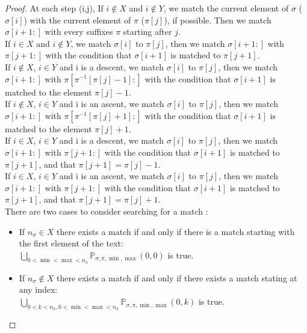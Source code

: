 \documentclass[a4paper]{llncs}
\newcommand{\ptext}{\pi}
\newcommand{\pmotif}{\sigma}
\newcommand{\x}{X}
\newcommand{\y}{Y}
\begin{document}
\begin{proof}
			At each step (i,j),
			If $i \notin \x$ and $i \notin \y$,
			we match the current element of $\pmotif$ ($\pmotif[i]$)
			with the current element of $\ptext$ ($\ptext[j]$), if possible.
			Then we match $\pmotif[i+1:]$ with 
			every suffixes $\ptext$ starting after $j$.\\
			
			If $i \in \x$ and $i \notin \y$,
			we match $\pmotif[i]$ to $\ptext[j]$, 
			then we match $\pmotif[i+1:]$ with $\ptext[j+1:]$
			with the condition that
			$\pmotif[i+1]$ is matched to $\ptext[j+1]$.\\
			
			If $i \notin \x$, $i \in \y$ and i is a descent,
			we match $\pmotif[i]$ to $\ptext[j]$, 
			then we match $\pmotif[i+1:]$ 
			with $\ptext[\ptext^{-1}[\ptext[j]-1]:]$
			with the condition that
			$\pmotif[i+1]$ is matched to the element $\ptext[j]-1$.\\						
			
			If $i \notin \x$, $i \in \y$ and i is an ascent,
			we match $\pmotif[i]$ to $\ptext[j]$, 
			then we match $\pmotif[i+1:]$ 
			with $\ptext[\ptext^{-1}[\ptext[j]+1]:]$
			with the condition that
			$\pmotif[i+1]$ is matched to the element $\ptext[j]+1$.\\	

			If $i \in \x$, $i \in \y$ and i is a descent,
			we match $\pmotif[i]$ to $\ptext[j]$, 
			then we match $\pmotif[i+1:]$ with $\ptext[j+1:]$
			with the condition that
			$\pmotif[i+1]$ is matched to $\ptext[j+1]$,
			and that $\ptext[j+1]=\ptext[j]-1$.\\			

			If $i \in \x$, $i \in \y$ and i is an ascent,
			we match $\pmotif[i]$ to $\ptext[j]$, 
			then we match $\pmotif[i+1:]$ with $\ptext[j+1:]$
			with the condition that
			$\pmotif[i+1]$ is matched to $\ptext[j+1]$,
			and that $\ptext[j+1]=\ptext[j]+1$.\\		
					
			There are two cases to consider searching for a match :
			\begin{itemize}
				\item If $n_\pmotif \in \x$ there exists a match if and only if there is a match starting with the first element of the text:\\ $\bigcup_{0<\min<\max<n_\ptext}\mathbb{P}_{\pmotif,\ptext,\min,\max}(0,0)$ is true.
				\item If $n_\pmotif \notin \x$ there exists a match if and only if there exists a match stating at any index: \\	$\bigcup_{0<k<n_\ptext,0<\min<\max<n_\ptext}\mathbb{P}_{\pmotif,\ptext,\min,\max}(0,k)$
							is true.	
			\end{itemize}

			
		
			\end{proof}
			
\end{document}
